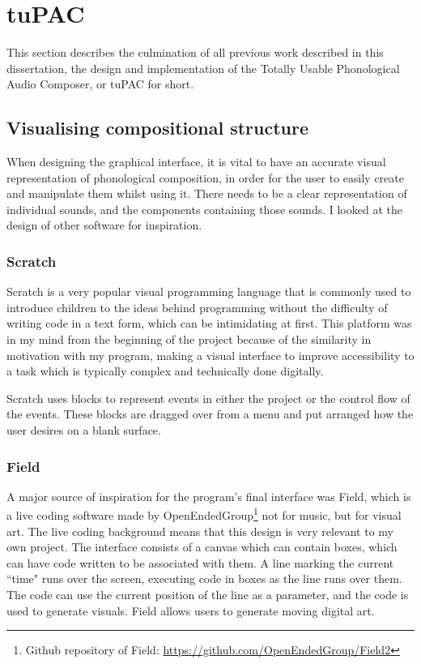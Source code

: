 \documentclass[12pt,a4paper,oneside,openright]{report}
\begin{document}
\section{tuPAC}

This section describes the culmination of all previous work described in this dissertation, the design and implementation of the Totally Usable Phonological Audio Composer, or tuPAC for short.

\subsection{Visualising compositional structure}
When designing the graphical interface, it is vital to have an accurate visual representation of phonological composition, in order for the user to easily create and manipulate them whilst using it. There needs to be a clear representation of individual sounds, and the components containing those sounds. I looked at the design of other software for inspiration.

\subsubsection{Scratch}
Scratch is a very popular visual programming language that is commonly used to introduce children to the ideas behind programming without the difficulty of writing code in a text form, which can be intimidating at first. This platform was in my mind from the beginning of the project because of the similarity in motivation with my program, making a visual interface to improve accessibility to a task which is typically complex and technically done digitally. 

Scratch uses blocks to represent events in either the project or the control flow of the events. These blocks are dragged over from a menu and put arranged how the user desires on a blank surface.

\subsubsection{Field}
A major source of inspiration for the program's final interface was Field, which is a live coding software made by OpenEndedGroup\footnote{Github repository of Field: \url{https://github.com/OpenEndedGroup/Field2}} not for music, but for visual art. The live coding background means that this design is very relevant to my own project. The interface consists of a canvas which can contain boxes, which can have code written to be associated with them. A line marking the current ``time" runs over the screen, executing code in boxes as the line runs over them. The code can use the current position of the line as a parameter, and the code is used to generate visuals. Field allows users to generate moving digital art.
\end{document}
